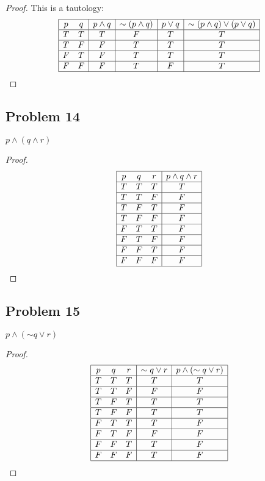 \documentclass[14pt]{extarticle}
\begin{document}
\begin{proof}
This is a tautology:
$$
\begin{array}{|cc|c|c|c|c|c|}
\hline
p & q & p \wedge q & {\sim (p \wedge q)} & p \vee q & {\sim(p \wedge q)} \vee
(p \vee q) \\
\hline
T & T & T & F & T & T \\
\hline
T & F & F & T & T & T \\
\hline
F & T & F & T & T & T \\
\hline
F & F & F & T & F & T \\
\hline
\end{array}
$$
\end{proof}

\subsection{Problem 14}
$p \wedge (q \wedge r)$

\begin{proof}
$$
\begin{array}{|ccc|c|}
\hline
p & q & r & p \wedge q \wedge r \\
\hline
T & T & T & T \\
\hline
T & T & F & F \\
\hline
T & F & T & F \\
\hline
T & F & F & F \\
\hline
F & T & T & F \\
\hline
F & T & F & F \\
\hline
F & F & T & F \\
\hline
F & F & F & F \\
\hline
\end{array}
$$
\end{proof}

\subsection{Problem 15}
$p \wedge ({\sim q} \vee r)$

\begin{proof}
$$
\begin{array}{|ccc|c|c|}
\hline
p & q & r & {\sim q} \vee r & p \wedge ({\sim q} \vee r) \\
\hline
T & T & T & T & T \\
\hline
T & T & F & F & F \\
\hline
T & F & T & T & T \\
\hline
T & F & F & T & T \\
\hline
F & T & T & T & F \\
\hline
F & T & F & F & F \\
\hline
F & F & T & T & F \\
\hline
F & F & F & T & F \\
\hline
\end{array}
$$
\end{proof}
\end{document}
